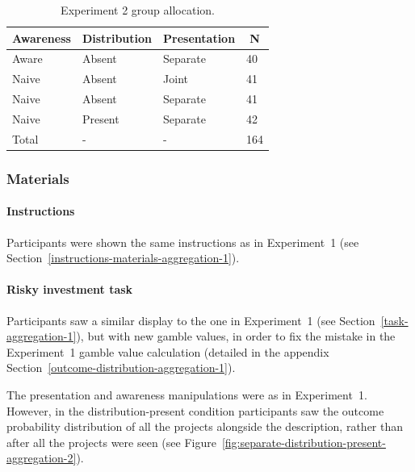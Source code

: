 \documentclass[a4paper, nobind, dvipsnames]{templates/ociamthesis}
\theoremstyle{definition}
\theoremstyle{definition}
\theoremstyle{definition}
\theoremstyle{definition}
\theoremstyle{remark}
\begin{document}
\begin{table}[tbp]

\begin{center}
\begin{threeparttable}

\caption{\label{tab:condition-allocation-aggregation-2}Experiment 2 group allocation.}

\begin{tabular}{llll}
\toprule
Awareness & \multicolumn{1}{c}{Distribution} & \multicolumn{1}{c}{Presentation} & \multicolumn{1}{c}{N}\\
\midrule
Aware & Absent & Separate & 40\\
Naive & Absent & Joint & 41\\
Naive & Absent & Separate & 41\\
Naive & Present & Separate & 42\\
Total & - & - & 164\\
\bottomrule
\end{tabular}

\end{threeparttable}
\end{center}

\end{table}

\subsubsection{Materials}

\paragraph{Instructions}

Participants were shown the same instructions as in Experiment~1 (see
Section~\ref{instructions-materials-aggregation-1}).

\hypertarget{task-aggregation-2}{%
\paragraph{Risky investment task}\label{task-aggregation-2}}

Participants saw a similar display to the one in Experiment~1 (see
Section~\ref{task-aggregation-1}), but with new gamble values, in order to fix
the mistake in the Experiment~1 gamble value calculation (detailed in the
appendix Section~\ref{outcome-distribution-aggregation-1}).

The presentation and awareness manipulations were as in Experiment~1. However,
in the distribution-present condition participants saw the outcome probability
distribution of all the projects alongside the description, rather than after
all the projects were seen (see
Figure~\ref{fig:separate-distribution-present-aggregation-2}).
\end{document}
